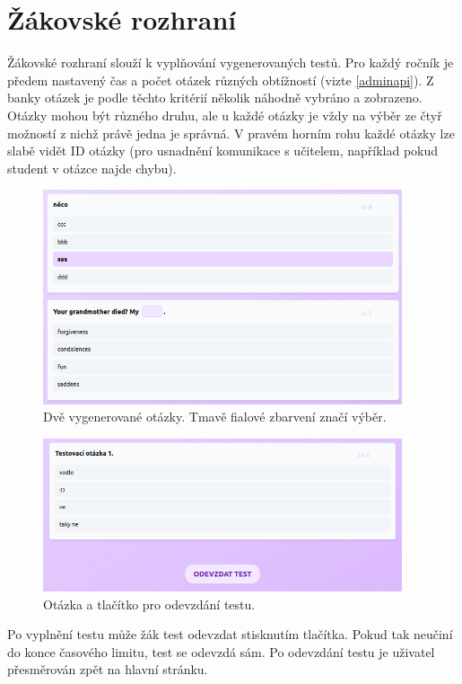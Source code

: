 \section{Žákovské rozhraní}

Žákovské rozhraní slouží k vyplňování vygenerovaných testů. Pro každý ročník je předem nastavený čas a počet otázek různých obtížností (vizte \ref{adminapi}). Z banky otázek je podle těchto kritérií několik náhodně vybráno a zobrazeno. Otázky mohou být různého druhu, ale u každé otázky je vždy na výběr ze čtyř možností z nichž právě jedna je správná. V pravém horním rohu každé otázky lze slabě vidět ID otázky (pro usnadnění komunikace s učitelem, například pokud student v otázce najde chybu).

\begin{figure}[H]
    \centering
    \includegraphics[width=400px]{images/01design/otazky.png}
    \caption{Dvě vygenerované otázky. Tmavě fialové zbarvení značí výběr.}
    \label{purplerect}
\end{figure}

\begin{figure}[H]
    \centering
    \includegraphics[width=400px]{images/01design/submit.png}
    \caption{Otázka a tlačítko pro odevzdání testu.}
\end{figure}

Po vyplnění testu může žák test odevzdat stisknutím tlačítka. Pokud tak neučiní do konce časového limitu, test se odevzdá sám. Po odevzdání testu je uživatel přesměrován zpět na hlavní stránku.

